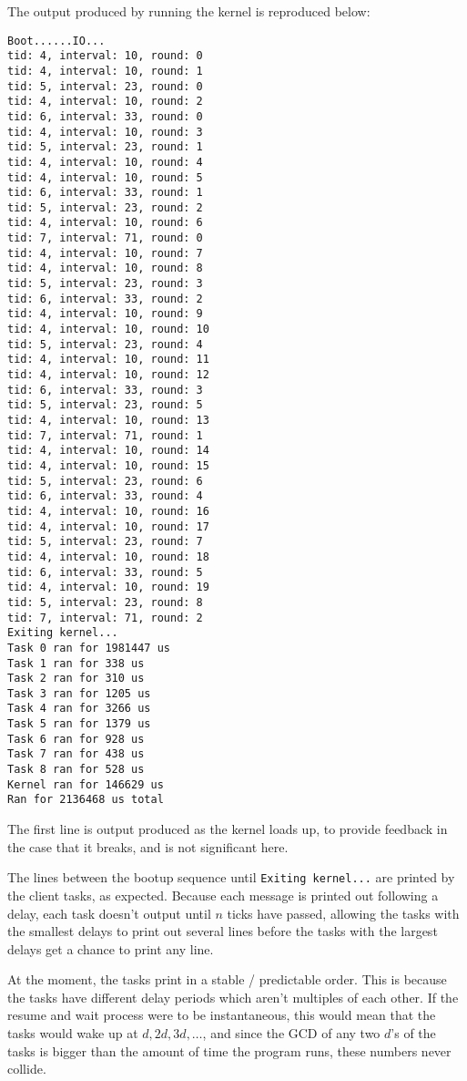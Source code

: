 \documentclass[titlepage]{article}
\begin{document}
The output produced by running the kernel is reproduced below:

\begin{verbatim}
Boot......IO...
tid: 4, interval: 10, round: 0
tid: 4, interval: 10, round: 1
tid: 5, interval: 23, round: 0
tid: 4, interval: 10, round: 2
tid: 6, interval: 33, round: 0
tid: 4, interval: 10, round: 3
tid: 5, interval: 23, round: 1
tid: 4, interval: 10, round: 4
tid: 4, interval: 10, round: 5
tid: 6, interval: 33, round: 1
tid: 5, interval: 23, round: 2
tid: 4, interval: 10, round: 6
tid: 7, interval: 71, round: 0
tid: 4, interval: 10, round: 7
tid: 4, interval: 10, round: 8
tid: 5, interval: 23, round: 3
tid: 6, interval: 33, round: 2
tid: 4, interval: 10, round: 9
tid: 4, interval: 10, round: 10
tid: 5, interval: 23, round: 4
tid: 4, interval: 10, round: 11
tid: 4, interval: 10, round: 12
tid: 6, interval: 33, round: 3
tid: 5, interval: 23, round: 5
tid: 4, interval: 10, round: 13
tid: 7, interval: 71, round: 1
tid: 4, interval: 10, round: 14
tid: 4, interval: 10, round: 15
tid: 5, interval: 23, round: 6
tid: 6, interval: 33, round: 4
tid: 4, interval: 10, round: 16
tid: 4, interval: 10, round: 17
tid: 5, interval: 23, round: 7
tid: 4, interval: 10, round: 18
tid: 6, interval: 33, round: 5
tid: 4, interval: 10, round: 19
tid: 5, interval: 23, round: 8
tid: 7, interval: 71, round: 2
Exiting kernel...
Task 0 ran for 1981447 us
Task 1 ran for 338 us
Task 2 ran for 310 us
Task 3 ran for 1205 us
Task 4 ran for 3266 us
Task 5 ran for 1379 us
Task 6 ran for 928 us
Task 7 ran for 438 us
Task 8 ran for 528 us
Kernel ran for 146629 us
Ran for 2136468 us total
\end{verbatim}

The first line is output produced as the kernel loads up, to provide feedback in the case that it breaks,
and is not significant here.

The lines between the bootup sequence until \texttt{Exiting kernel...} are
printed by the client tasks, as expected.  Because each message is printed out
following a delay, each task doesn't output until $n$ ticks have passed,
allowing the tasks with the smallest delays to print out several lines before
the tasks with the largest delays get a chance to print any line.

At the moment, the tasks print in a stable / predictable order.
This is because the tasks have different delay periods which aren't multiples
of each other. If the resume and wait process were to be instantaneous, this
would mean that the tasks would wake up at $d, 2d, 3d, \ldots$, and since the
GCD of any two $d$'s of the tasks is bigger than the amount of time the program
runs, these numbers never collide.
\end{document}
